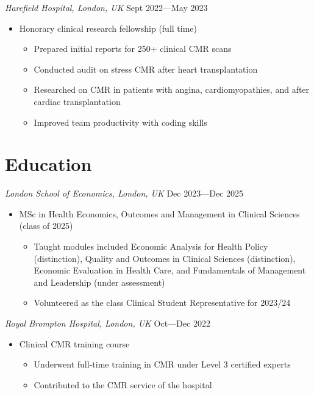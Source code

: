 \documentclass[
  11pt,
]
{article}
\providecommand{\tightlist}{%
  \setlength{\itemsep}{0pt}\setlength{\parskip}{0pt}}
\begin{document}
\emph{Harefield Hospital, London, UK} \hfill Sept 2022---May 2023

\begin{itemize}
\tightlist
\item
  Honorary clinical research fellowship (full time)

  \begin{itemize}
  \tightlist
  \item
    Prepared initial reports for 250+ clinical CMR scans
  \item
    Conducted audit on stress CMR after heart transplantation
  \item
    Researched on CMR in patients with angina, cardiomyopathies, and
    after cardiac transplantation
  \item
    Improved team productivity with coding skills
  \end{itemize}
\end{itemize}

\section{Education}\label{education}

\emph{London School of Economics, London, UK} \hfill Dec 2023---Dec 2025

\begin{itemize}
\tightlist
\item
  MSc in Health Economics, Outcomes and Management in Clinical Sciences
  (class of 2025)

  \begin{itemize}
  \tightlist
  \item
    Taught modules included Economic Analysis for Health Policy
    (distinction), Quality and Outcomes in Clinical Sciences
    (distinction), Economic Evaluation in Health Care, and Fundamentals
    of Management and Leadership (under assessment)
  \item
    Volunteered as the class Clinical Student Representative for 2023/24
  \end{itemize}
\end{itemize}

\emph{Royal Brompton Hospital, London, UK} \hfill Oct---Dec 2022

\begin{itemize}
\tightlist
\item
  Clinical CMR training course

  \begin{itemize}
  \tightlist
  \item
    Underwent full-time training in CMR under Level 3 certified experts
  \item
    Contributed to the CMR service of the hospital
  \end{itemize}
\end{itemize}
\end{document}
